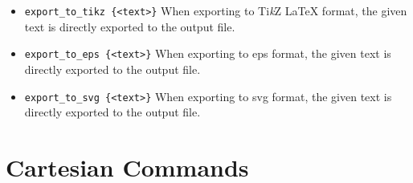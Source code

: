 \documentclass[a4paper]{book}
\begin{document}
\begin{itemize}
\item \verb|export_to_tikz {<text>}|
        When exporting to Ti{\em k}Z \LaTeX{} format, the given text is directly
        exported to the output file.

\item \verb|export_to_eps {<text>}|
        When exporting to {\sc eps} format, the given text is directly
        exported to the output file.

\item \verb|export_to_svg {<text>}|
        When exporting to {\sc svg} format, the given text is directly
        exported to the output file.
\end{itemize}


\section{Cartesian Commands}
\end{document}
